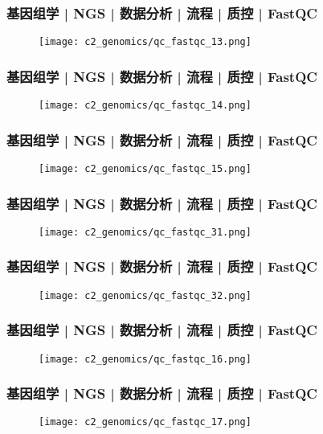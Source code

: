 \begin{frame}
  \frametitle{基因组学 | NGS | 数据分析 | 流程 | 质控 | FastQC}
  \begin{figure}
    \centering
    \texttt{[image: c2\_genomics/qc\_fastqc\_13.png]}
  \end{figure}
\end{frame}

\begin{frame}
  \frametitle{基因组学 | NGS | 数据分析 | 流程 | 质控 | FastQC}
  \begin{figure}
    \centering
    \texttt{[image: c2\_genomics/qc\_fastqc\_14.png]}
  \end{figure}
\end{frame}

\begin{frame}
  \frametitle{基因组学 | NGS | 数据分析 | 流程 | 质控 | FastQC}
  \begin{figure}
    \centering
    \texttt{[image: c2\_genomics/qc\_fastqc\_15.png]}
  \end{figure}
\end{frame}

\begin{frame}
  \frametitle{基因组学 | NGS | 数据分析 | 流程 | 质控 | FastQC}
  \begin{figure}
    \centering
    \texttt{[image: c2\_genomics/qc\_fastqc\_31.png]}
  \end{figure}
\end{frame}

\begin{frame}
  \frametitle{基因组学 | NGS | 数据分析 | 流程 | 质控 | FastQC}
  \begin{figure}
    \centering
    \texttt{[image: c2\_genomics/qc\_fastqc\_32.png]}
  \end{figure}
\end{frame}

\begin{frame}
  \frametitle{基因组学 | NGS | 数据分析 | 流程 | 质控 | FastQC}
  \begin{figure}
    \centering
    \texttt{[image: c2\_genomics/qc\_fastqc\_16.png]}
  \end{figure}
\end{frame}

\begin{frame}
  \frametitle{基因组学 | NGS | 数据分析 | 流程 | 质控 | FastQC}
  \begin{figure}
    \centering
    \texttt{[image: c2\_genomics/qc\_fastqc\_17.png]}
  \end{figure}
\end{frame}

